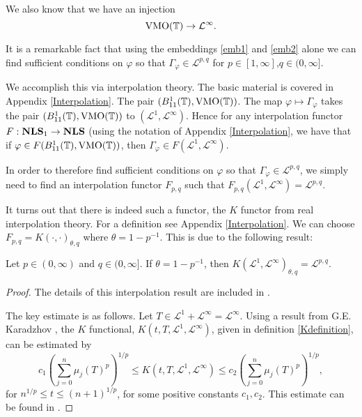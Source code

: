We also know that we have an injection
\begin{equation}
\label{emb2}
    \VMO(\Circ) \to \mathcal{L}^\infty.
\end{equation}


It is a remarkable fact that using the embeddings \ref{emb1}
and \ref{emb2} alone we can find sufficient conditions on $\varphi$
so that $\Gamma_\varphi \in \mathcal{L}^{p,q}$ for $p\in [1,\infty]$,$q \in (0,\infty]$.

We accomplish this via interpolation theory.
The basic material is covered in Appendix \ref{Interpolation}. The pair $(B_{11}^1(\mathbb{T}),\operatorname{VMO}(\mathbb{T}))$.
The map $\varphi \mapsto \Gamma_\varphi$ takes the pair
$(B_{11}^1(\mathbb{T}),\operatorname{VMO}(\mathbb{T}))$ to $(\mathcal{L}^1,\mathcal{L}^\infty)$.
Hence for any interpolation functor $F:\mathrm{\mathbf{NLS}}_1\to\mathrm{\mathbf{NLS}}$ (using the notation
of Appendix \ref{Interpolation}, we have that if $\varphi \in F(B_{11}^1(\mathbb{T}),\operatorname{VMO}(\mathbb{T}))$,
then $\Gamma_{\varphi} \in F(\mathcal{L}^1,\mathcal{L}^\infty)$.

In order to therefore find sufficient conditions on $\varphi$ so that $\Gamma_\varphi \in \mathcal{L}^{p,q}$,
we simply need to find an interpolation functor $F_{p,q}$ such that $F_{p,q}(\mathcal{L}^1,\mathcal{L}^\infty) = \mathcal{L}^{p,q}$.

It turns out that there is indeed such a functor, the $K$ functor from real interpolation theory.
For a definition see Appendix \ref{Interpolation}. We can choose $F_{p,q} = K(\cdot,\cdot)_{\theta,q}$
where $\theta = 1-p^{-1}$. This is due to the following result:
\begin{proposition}
\label{LpqInterp}
    Let $p \in (0,\infty)$ and $q \in (0,\infty]$. If $\theta = 1-p^{-1}$, then $K(\mathcal{L}^1,\mathcal{L}^\infty)_{\theta,q} = \mathcal{L}^{p,q}$.
\end{proposition}
\begin{proof}
    The details of this interpolation result are included in \cite{DDP92}.
    
    The key estimate is as follows.
    Let $T \in \mathcal{L}^1+\mathcal{L}^\infty = \mathcal{L}^\infty$.
    Using a result from G.E. Karadzhov \cite{Karadzhov},
    the $K$ functional, $K(t,T,\mathcal{L}^1,\mathcal{L}^\infty)$, given in
    definition \ref{Kdefinition}, can be estimated by
    \begin{equation}
        c_1\left(\sum_{j=0}^n \mu_j(T)^p\right)^{1/p} \leq K(t,T,\mathcal{L}^1,\mathcal{L}^\infty) \leq c_2\left(\sum_{j=0}^n \mu_j(T)^p\right)^{1/p},
    \end{equation}
    for $n^{1/p} \leq t \leq (n+1)^{1/p}$, for some positive constants $c_1,c_2$. This
    estimate can be found in \cite{Karadzhov}.
\end{proof}


